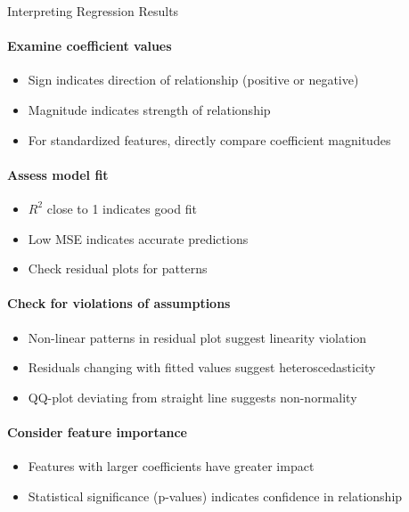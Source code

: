 \begin{KR}{Interpreting Regression Results}
\paragraph{Examine coefficient values}
\begin{itemize}
    \item Sign indicates direction of relationship (positive or negative)
    \item Magnitude indicates strength of relationship
    \item For standardized features, directly compare coefficient magnitudes
\end{itemize}

\paragraph{Assess model fit}
\begin{itemize}
    \item $R^2$ close to 1 indicates good fit
    \item Low MSE indicates accurate predictions
    \item Check residual plots for patterns
\end{itemize}

\paragraph{Check for violations of assumptions}
\begin{itemize}
    \item Non-linear patterns in residual plot suggest linearity violation
    \item Residuals changing with fitted values suggest heteroscedasticity
    \item QQ-plot deviating from straight line suggests non-normality
\end{itemize}

\paragraph{Consider feature importance}
\begin{itemize}
    \item Features with larger coefficients have greater impact
    \item Statistical significance (p-values) indicates confidence in relationship
\end{itemize}
\end{KR}


